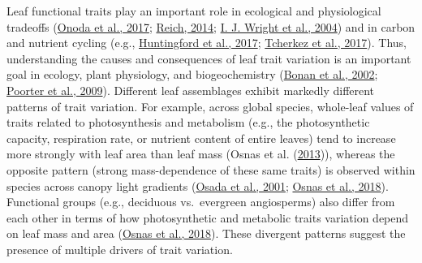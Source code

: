 \documentclass[
  12pt,
  a4paper,
,tablecaptionabove
]{scrartcl}
\begin{document}
Leaf functional traits play an important role in ecological and
physiological tradeoffs (\protect\hyperlink{ref-Onoda2017}{Onoda et al.,
2017}; \protect\hyperlink{ref-Reich2014}{Reich, 2014};
\protect\hyperlink{ref-Wright2004a}{I. J. Wright et al., 2004}) and in
carbon and nutrient cycling (e.g.,
\protect\hyperlink{ref-Huntingford2017}{Huntingford et al., 2017};
\protect\hyperlink{ref-Tcherkez2017}{Tcherkez et al., 2017}). Thus,
understanding the causes and consequences of leaf trait variation is an
important goal in ecology, plant physiology, and biogeochemistry
(\protect\hyperlink{ref-Bonan2002}{Bonan et al., 2002};
\protect\hyperlink{ref-Poorter2009}{Poorter et al., 2009}). Different
leaf assemblages exhibit markedly different patterns of trait variation.
For example, across global species, whole-leaf values of traits related
to photosynthesis and metabolism (e.g., the photosynthetic capacity,
respiration rate, or nutrient content of entire leaves) tend to increase
more strongly with leaf area than leaf mass (Osnas et al.
(\protect\hyperlink{ref-Osnas2013}{2013})), whereas the opposite pattern
(strong mass-dependence of these same traits) is observed within species
across canopy light gradients (\protect\hyperlink{ref-Osada2001}{Osada
et al., 2001}; \protect\hyperlink{ref-Osnas2018}{Osnas et al., 2018}).
Functional groups (e.g., deciduous vs.~evergreen angiosperms) also
differ from each other in terms of how photosynthetic and metabolic
traits variation depend on leaf mass and area
(\protect\hyperlink{ref-Osnas2018}{Osnas et al., 2018}). These divergent
patterns suggest the presence of multiple drivers of trait variation.
\end{document}
